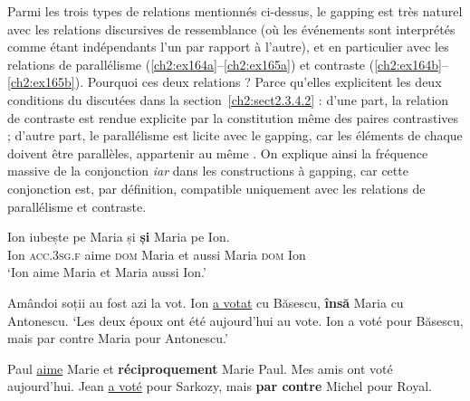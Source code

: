Parmi les trois types de relations mentionnés ci-dessus, le gapping est très naturel avec les relations discursives de ressemblance (où les événements sont interprétés comme étant indépendants l’un par rapport à l’autre), et en particulier avec les relations de parallélisme (\ref{ch2:ex164a}--\ref{ch2:ex165a}) et contraste (\ref{ch2:ex164b}--\ref{ch2:ex165b}). Pourquoi ces deux relations ? Parce qu’elles explicitent les deux conditions du  discutées dans la section~\ref{ch2:sect2.3.4.2} : d’une part, la relation de contraste est rendue explicite par la constitution même des paires contrastives ; d’autre part, le parallélisme est licite avec le gapping, car les éléments de chaque  doivent être parallèles, {\cad} appartenir au même . On explique ainsi la fréquence massive de la conjonction \textit{iar} dans les constructions à gapping, car cette conjonction est, par définition, compatible uniquement avec les relations de parallélisme et contraste. 

\ea
\ea 
\gll Ion    iubește  pe  Maria  și  \textbf{și}  Maria  pe  Ion. \label{ch2:ex164a}\\
Ion  \textsc{acc.3sg.f} aime \textsc{dom} Maria  et  aussi  Maria \textsc{dom} Ion\\
\glt ‘Ion aime Maria et Maria aussi Ion.’  

\ex Amândoi soții au fost azi la vot. Ion \uline{a votat} cu Băsescu, \textbf{însă} Maria cu Antonescu. \label{ch2:ex164b} 
\glt ‘Les deux époux ont été aujourd’hui au vote. Ion a voté pour Băsescu, mais par contre Maria pour Antonescu.’   
\z
\z


\ea
\ea Paul \uline{aime} Marie et \textbf{réciproquement} Marie Paul. \label{ch2:ex165a}  
\ex Mes amis ont voté aujourd’hui. Jean \uline{a voté} pour Sarkozy, mais \textbf{par contre} Michel pour Royal. \label{ch2:ex165b}
\z
\z

